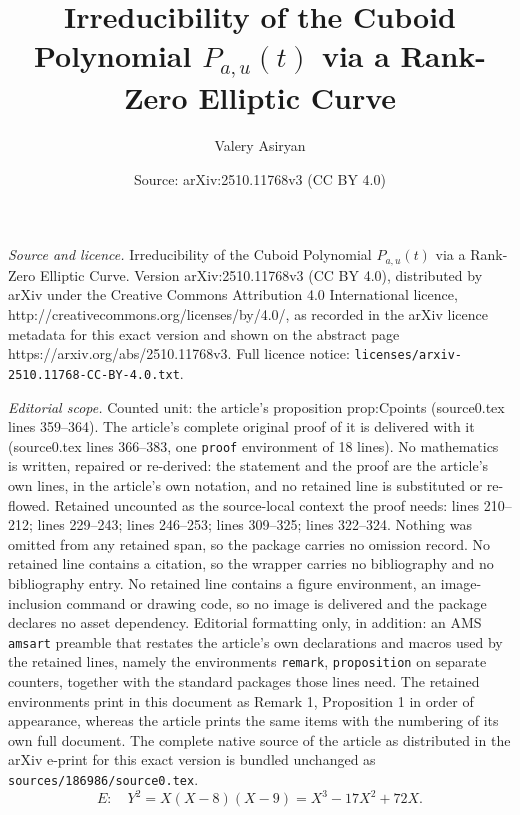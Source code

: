 \documentclass[10pt,a4paper]{amsart}
\title{Irreducibility of the Cuboid Polynomial $P_{a,u}(t)$ via a Rank-Zero Elliptic Curve}
\author{Valery Asiryan}
\date{Source: arXiv:2510.11768v3 (CC BY 4.0)}
\begin{document}
\maketitle

\noindent\emph{Source and licence.} Irreducibility of the Cuboid Polynomial $P_{a,u}(t)$ via a Rank-Zero Elliptic Curve. Version arXiv:2510.11768v3 (CC BY 4.0), distributed by arXiv under the Creative Commons Attribution 4.0 International licence, http://creativecommons.org/licenses/by/4.0/, as recorded in the arXiv licence metadata for this exact version and shown on the abstract page https://arxiv.org/abs/2510.11768v3. Full licence notice: \texttt{licenses/arxiv-2510.11768-CC-BY-4.0.txt}.\par\smallskip

\noindent\textit{Editorial scope.} Counted unit: the article's proposition prop:Cpoints (source0.tex lines 359--364). The article's complete original proof of it is delivered with it (source0.tex lines 366--383, one \texttt{proof} environment of 18 lines). No mathematics is written, repaired or re-derived: the statement and the proof are the article's own lines, in the article's own notation, and no retained line is substituted or re-flowed.  Retained uncounted as the source-local context the proof needs: lines 210--212; lines 229--243; lines 246--253; lines 309--325; lines 322--324.  Nothing was omitted from any retained span, so the package carries no omission record.  No retained line contains a citation, so the wrapper carries no bibliography and no bibliography entry.  No retained line contains a figure environment, an image-inclusion command or drawing code, so no image is delivered and the package declares no asset dependency.  Editorial formatting only, in addition: an AMS \texttt{amsart} preamble that restates the article's own declarations and macros used by the retained lines, namely the environments \texttt{remark}, \texttt{proposition} on separate counters, together with the standard packages those lines need.  The retained environments print in this document as Remark 1, Proposition 1 in order of appearance, whereas the article prints the same items with the numbering of its own full document.  The complete native source of the article as distributed in the arXiv e-print for this exact version is bundled unchanged as \texttt{sources/186986/source0.tex}.
\begin{equation}\label{eq:E}
E:\quad Y^2=X(X-8)(X-9)=X^3-17X^2+72X.
\end{equation}
\end{document}
